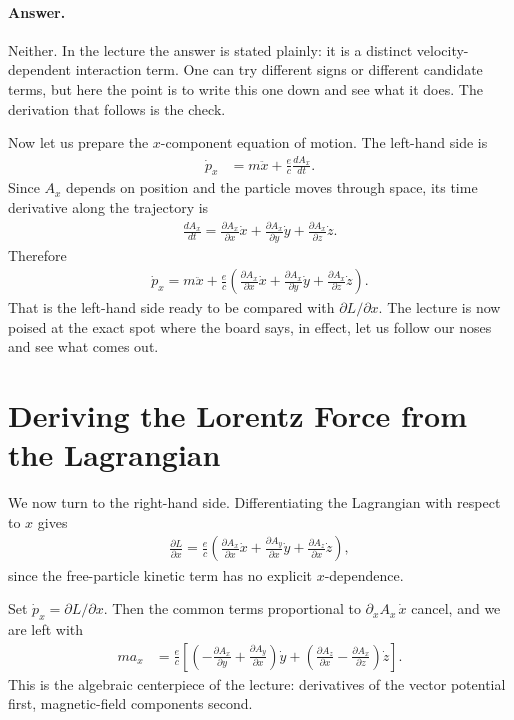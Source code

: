 \paragraph{Answer.} Neither. In the lecture the answer is stated plainly: it is a distinct velocity-dependent interaction term. One can try different signs or different candidate terms, but here the point is to write this one down and see what it does. The derivation that follows is the check.

Now let us prepare the \(x\)-component equation of motion. The left-hand side is
\begin{align}
\dot p_x
&=
m\ddot x+\frac{e}{c}\frac{dA_x}{dt}.
\end{align}
Since \(A_x\) depends on position and the particle moves through space, its time derivative along the trajectory is
\begin{align}
\frac{dA_x}{dt}
=
\frac{\partial A_x}{\partial x}\dot x
+
\frac{\partial A_x}{\partial y}\dot y
+
\frac{\partial A_x}{\partial z}\dot z.
\end{align}
Therefore
\begin{align}
\dot p_x
=
m\ddot x
+
\frac{e}{c}
\left(
\frac{\partial A_x}{\partial x}\dot x
+
\frac{\partial A_x}{\partial y}\dot y
+
\frac{\partial A_x}{\partial z}\dot z
\right).
\end{align}
That is the left-hand side ready to be compared with \(\partial L/\partial x\). The lecture is now poised at the exact spot where the board says, in effect, let us follow our noses and see what comes out.

\section{Deriving the Lorentz Force from the Lagrangian}

We now turn to the right-hand side. Differentiating the Lagrangian with respect to \(x\) gives
\begin{align}
\frac{\partial L}{\partial x}
=
\frac{e}{c}
\left(
\frac{\partial A_x}{\partial x}\dot x
+
\frac{\partial A_y}{\partial x}\dot y
+
\frac{\partial A_z}{\partial x}\dot z
\right),
\end{align}
since the free-particle kinetic term has no explicit \(x\)-dependence.

Set \(\dot p_x=\partial L/\partial x\). Then the common terms proportional to \(\partial_x A_x\,\dot x\) cancel, and we are left with
\begin{align}
m a_x
&=
\frac{e}{c}
\left[
\left(
-\frac{\partial A_x}{\partial y}
+\frac{\partial A_y}{\partial x}
\right)\dot y
+
\left(
\frac{\partial A_z}{\partial x}
-\frac{\partial A_x}{\partial z}
\right)\dot z
\right].
\end{align}
This is the algebraic centerpiece of the lecture: derivatives of the vector potential first, magnetic-field components second.

